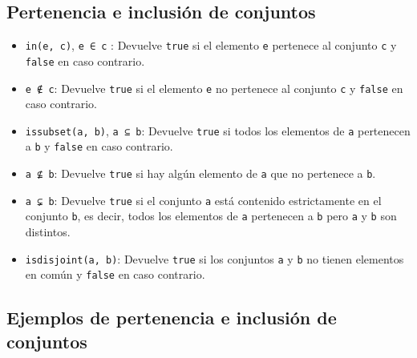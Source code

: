 \documentclass[
  letterpaper,
  DIV=11,
  numbers=noendperiod]{scrreprt}
\providecommand{\tightlist}{%
  \setlength{\itemsep}{0pt}\setlength{\parskip}{0pt}}\usepackage{longtable,booktabs,array}
\begin{document}
\hypertarget{pertenencia-e-inclusiuxf3n-de-conjuntos}{%
\subsection{Pertenencia e inclusión de
conjuntos}\label{pertenencia-e-inclusiuxf3n-de-conjuntos}}

\begin{itemize}
\tightlist
\item
  \texttt{in(e,\ c)}, \texttt{e\ ∈\ c} : Devuelve \texttt{true} si el
  elemento \texttt{e} pertenece al conjunto \texttt{c} y \texttt{false}
  en caso contrario.
\item
  \texttt{e\ ∉\ c}: Devuelve \texttt{true} si el elemento \texttt{e} no
  pertenece al conjunto \texttt{c} y \texttt{false} en caso contrario.
\item
  \texttt{issubset(a,\ b)}, \texttt{a\ ⊆\ b}: Devuelve \texttt{true} si
  todos los elementos de \texttt{a} pertenecen a \texttt{b} y
  \texttt{false} en caso contrario.
\item
  \texttt{a\ ⊈\ b}: Devuelve \texttt{true} si hay algún elemento de
  \texttt{a} que no pertenece a \texttt{b}.
\item
  \texttt{a\ ⊊\ b}: Devuelve \texttt{true} si el conjunto \texttt{a}
  está contenido estrictamente en el conjunto \texttt{b}, es decir,
  todos los elementos de \texttt{a} pertenecen a \texttt{b} pero
  \texttt{a} y \texttt{b} son distintos.
\item
  \texttt{isdisjoint(a,\ b)}: Devuelve \texttt{true} si los conjuntos
  \texttt{a} y \texttt{b} no tienen elementos en común y \texttt{false}
  en caso contrario.
\end{itemize}

\hypertarget{ejemplos-de-pertenencia-e-inclusiuxf3n-de-conjuntos}{%
\subsection{Ejemplos de pertenencia e inclusión de
conjuntos}\label{ejemplos-de-pertenencia-e-inclusiuxf3n-de-conjuntos}}
\end{document}
